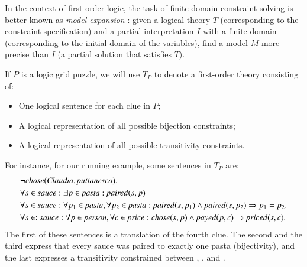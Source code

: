 In the context of first-order logic, the task of finite-domain constraint solving is better known as \emph{model expansion} \cite{MitchellTHM06}: given a logical theory $T$ (corresponding to the constraint specification) and a partial interpretation $I$ with a finite domain (corresponding to the initial domain of the variables), find a model $M$ more precise than $I$ (a partial solution that satisfies $T$).

If $P$ is a logic grid puzzle, we will use $T_P$ to denote a first-order theory consisting of:
\begin{itemize}
 \item One logical sentence for each clue in $P$;
 \item A logical representation of all possible bijection constraints;
 \item A logical representation of all possible transitivity constraints.
\end{itemize}
% 
For instance, for our running example, some sentences in $T_P$ are: 
\begin{align*}
 &\lnot \chose(\claudia, \puttanesca).\\
 & \forall s\in  \sauce : \exists p\in \pasta : \paired(s,p)\\
 & \forall s\in \sauce: \forall p_1\in  \pasta, \forall p_2\in  \pasta:  \paired(s,p_1)\land  \paired(s,p_2)\limplies p_1=p_2. \\
 & \forall s\in :\sauce: \forall p\in \person, \forall c\in \price: \chose(s,p)\land \payed(p,c)\limplies \priced(s,c).  %
\end{align*}
The first of these sentences is a translation of the fourth clue. The second and the third express that every sauce was paired to exactly one pasta (bijectivity), and the last expresses a transitivity constrained between \chose, \payed, and  \priced. 



